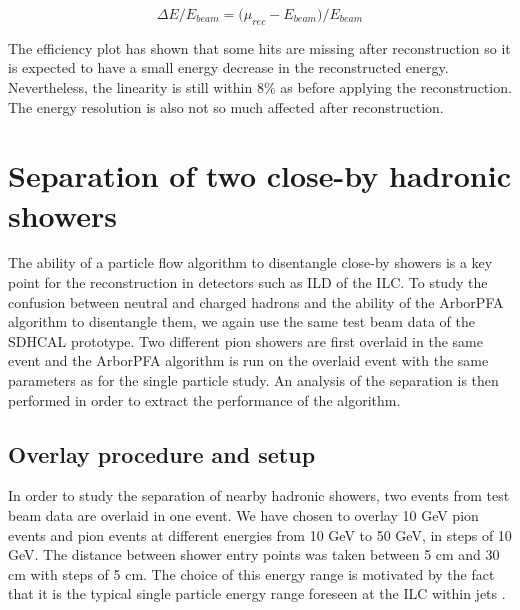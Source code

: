 \documentclass[12pt]{article}
\begin{document}
\begin{equation}
  \Delta E/E_{beam} = \Big(\mu_{rec} - E_{beam}\Big)/E_{beam}
\end{equation}

The efficiency plot has shown that some hits are missing after reconstruction so it is expected to have a small energy decrease in the reconstructed energy. Nevertheless, the linearity is still within 8\% as before applying the reconstruction. The energy resolution is also not so much affected after reconstruction.

\section{Separation of two close-by hadronic showers}

The ability of a particle flow algorithm to disentangle close-by showers is a key point for the reconstruction in detectors such as ILD of the ILC. To study the confusion between neutral and charged hadrons and the ability of the ArborPFA algorithm to disentangle them, we again use the same test beam data of the SDHCAL prototype. Two different pion showers are first overlaid in the same event and the ArborPFA algorithm is run on the overlaid event with the same parameters as for the single particle study. An analysis of the separation is then performed in order to extract the performance of the algorithm.

\subsection{Overlay procedure and setup}

In order to study the separation of nearby hadronic showers, two events from test beam data are overlaid in one event. We have chosen to overlay 10 GeV pion events and pion events at different energies from 10 GeV to 50 GeV, in steps of 10 GeV. The distance between shower entry points was taken between 5 cm and 30 cm with steps of 5 cm. The choice of this energy range is motivated by the fact that it is the typical single particle energy range foreseen at the ILC within jets \cite{hadron-jets}.
\end{document}
